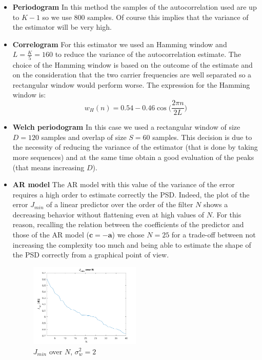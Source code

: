 \documentclass[a4paper, 12pt]{report}
\begin{document}
\begin{itemize}
	
\item {\bf Periodogram} In this method the samples of the autocorrelation used are up to $K-1$ so we use 800 samples. Of course this implies that the variance of the estimator will be very high.

\item {\bf Correlogram}  For this estimator we used an Hamming window and $L=\frac{K}{5}=160$ to reduce the variance of the autocorrelation estimate. The choice of the Hamming window is based on the outcome of the estimate and on the consideration that the two carrier frequencies are well separated so a rectangular window would perform worse. The expression for the Hamming window is:
\begin{equation}
w_H(n)=0.54-0.46\cos\Big( \frac{2 \pi n}{2L} \Big)
\end{equation}

\item {\bf Welch periodogram} In this case we used a rectangular window of size $D=120$ samples and overlap of size $S=60$ samples. This decision is due to the necessity of reducing the variance of the estimator (that is done by taking more sequences) and at the same time obtain a good evaluation of the peaks (that means increasing $D$). 

\item {\bf AR model} The AR model with this value of the variance of the error requires a high order to estimate correctly the PSD. Indeed, the plot of the error $J_{min}$ of a linear predictor over the order of the filter $N$ shows a decreasing behavior without flattening even at high values of $N$. For this reason, recalling the relation between the coefficients of the predictor and those of the AR model ($\mathbf{c} = -\mathbf{a}$)  we chose $N=25$ for a trade-off between not increasing the complexity too much and being able to estimate the shape of the PSD correctly from a graphical point of view.  %

\begin{figure}[H]
	\centering
	\includegraphics[width=0.5\textwidth]{choiceofn_ex1}
	\caption{$J_{min}$ over $N$, $\sigma_w^2 = 2$}
	\label{fig:choiceofn_ex1}
\end{figure}

\end{itemize}
\end{document}
